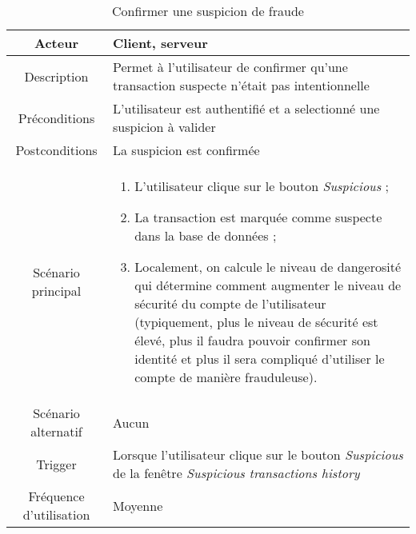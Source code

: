 \documentclass{article}
\begin{document}
\begin{table}

\begin{tabular}{|c|p{11cm}|}
\hline
Acteur & Client, serveur \\
\hline
Description & Permet à l'utilisateur de confirmer qu'une transaction suspecte n'était pas intentionnelle \\
\hline
Préconditions & L'utilisateur est authentifié et a selectionné une suspicion à valider \\
\hline
Postconditions & La suspicion est confirmée \\
\hline
Scénario principal & \begin{enumerate}
\item L'utilisateur clique sur le bouton \emph{Suspicious} ;
\item La transaction est marquée comme suspecte dans la base de données ;
\item Localement, on calcule le niveau de dangerosité qui détermine comment augmenter le niveau de sécurité du compte de l'utilisateur (typiquement, plus le niveau de sécurité est élevé, plus il faudra pouvoir confirmer son identité et plus il sera compliqué d'utiliser le compte de manière frauduleuse).
\end{enumerate} \\
\hline
Scénario alternatif & Aucun \\
\hline
Trigger & Lorsque l'utilisateur clique sur le bouton \emph{Suspicious} de la fenêtre  \emph{Suspicious transactions history} \\
\hline
Fréquence d'utilisation & Moyenne \\
\hline
\end{tabular}

\caption{Confirmer une suspicion de fraude}

\end{table}
\end{document}
